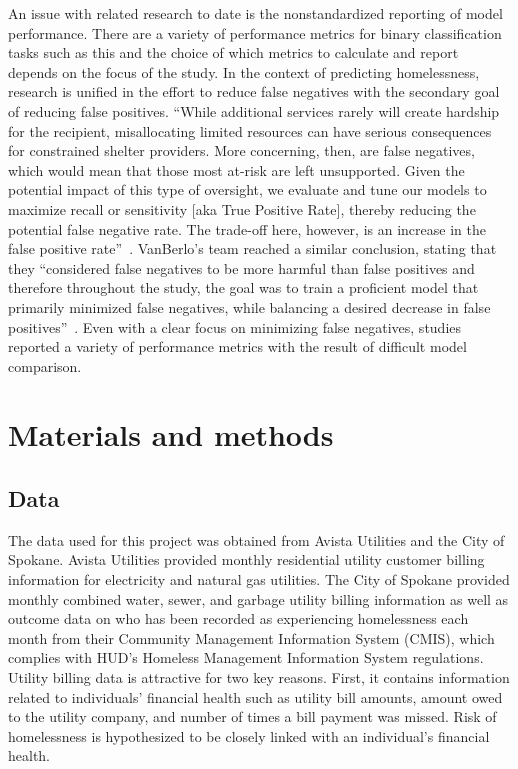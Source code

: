 \documentclass[10pt,letterpaper]{article}
\newcommand{\red}[1]{{\color{red}{#1}}}
\begin{document}
An issue with related research to date is the nonstandardized reporting of model performance. There are a variety of performance metrics for binary classification tasks such as this and the choice of which metrics to calculate and report depends on the focus of the study. In the context of predicting homelessness, research is unified in the effort to reduce false negatives with the secondary goal of reducing false positives. ``While  additional  services  rarely  will  create  hardship  for the  recipient,  misallocating  limited  resources  can  have  serious  consequences for constrained shelter providers. More concerning, then, are false negatives, which  would  mean  that  those  most  at-risk  are  left  unsupported.  Given  the potential  impact  of  this  type  of  oversight,  we  evaluate  and  tune  our  models to maximize recall or sensitivity [aka True Positive Rate], thereby reducing the potential false negative rate.  The  trade-off  here,  however,  is  an increase  in  the  false  positive  rate''~\cite{hong2018applications}. VanBerlo's team reached a similar conclusion, stating that they ``considered false negatives to be more harmful than false positives and therefore throughout the study, the goal was to train a proficient model that primarily minimized false negatives, while balancing a desired decrease in false positives''~\cite{vanberlo2021interpretable}. Even with a clear focus on minimizing false negatives, studies reported a variety of performance metrics with the result of difficult model comparison. \red{remove previous paragraph?}

\section*{Materials and methods}
\subsection*{Data}
The data used for this project was obtained from Avista Utilities and the City of Spokane. Avista Utilities provided monthly residential utility customer billing information for electricity and natural gas utilities. The City of Spokane provided monthly combined water, sewer, and garbage utility billing information as well as outcome data on who has been recorded as experiencing homelessness each month from their Community Management Information System (CMIS), which complies with HUD's Homeless Management Information System regulations. Utility billing data is attractive for two key reasons. First, it contains information related to individuals' financial health such as utility bill amounts, amount owed to the utility company, and number of times a bill payment was missed. Risk of homelessness is hypothesized to be closely linked with an individual's financial health.
\end{document}
